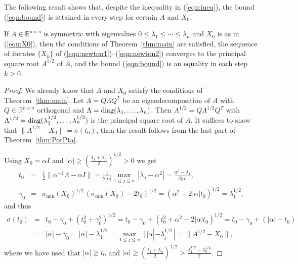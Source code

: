 \documentclass{siamltex}
\begin{document}
The following result shows that, despite the inequality in (\ref{eqn:ineq}),
the bound (\ref{eqn:bound}) is attained in every step for certain $A$ and $X_0$.

\medskip
\begin{corollary}\label{cor:exactSQ}
If $A\in {\mathbb R}^{n\times n}$ is symmetric with  eigenvalues
$0\leq \lambda_1\leq\cdots\leq\lambda_n$ and $X_0$ is as in (\ref{eqn:X0}),
then the conditions of Theorem~\ref{thm:main} are satisfied, the sequence
of iterates $\{X_k\}$ of (\ref{eqn:newton1})--(\ref{eqn:newton2}) converges 
to the principal square root $A^{1/2}$ of $A$, and the bound (\ref{eqn:bound}) 
is an equality in each step $k\geq 0$.
\end{corollary}

\medskip
\begin{proof}
We already know that $A$ and $X_0$ satisfy the conditions of Theorem~\ref{thm:main}.
Let $A=Q\Lambda Q^T$ be an eigendecomposition of $A$ with $Q\in {\mathbb R}^{n\times n}$
orthogonal and $\Lambda={\rm diag}(\lambda_1,\dots,\lambda_n)$. Then
$A^{1/2}=Q\Lambda^{1/2} Q^T$ with
$\Lambda^{1/2}={\rm diag}(\lambda_1^{1/2},\dots,\lambda_n^{1/2})$ is the principal square
root of $A$. It suffices to show that $\|A^{1/2}-X_0\|=\sigma(t_0)$, then the result
follows from the last part of Theorem~\ref{thm:PotPta}.

Using $X_0=\alpha I$ and $|\alpha|\geq \left(\frac{\lambda_1+\lambda_n}{2}\right)^{1/2}>0$ we get
\begin{eqnarray*}
t_0 &=& \frac12\|\alpha^{-1}\Lambda -\alpha I\|=\frac{1}{2|\alpha|}\max_{1\leq j\leq n}\,|\lambda_j-\alpha^2|
=\frac{\alpha^2-\lambda_1}{2|\alpha|},\\
\gamma_0 &=& \sigma_{\min}(X_0)^{1/2}\,(\sigma_{\min}(X_0)-2t_0)^{1/2} =
(\alpha^2-2|\alpha| t_0)^{1/2} = \lambda_1^{1/2},
\end{eqnarray*}
and thus
\begin{eqnarray*}
\sigma(t_0) &=& t_0-\gamma_0+(t_0^2+\gamma_0^2)^{1/2} = t_0-\gamma_0+(t_0^2+\alpha^2-2|\alpha| t_0)^{1/2}
= t_0-\gamma_0+(|\alpha|-t_0)\\
&=&|\alpha|-\gamma_0 = |\alpha|-\lambda_1^{1/2} = \max_{1\leq j\leq n}\,|\,|\alpha|-\lambda_j^{1/2}\,| =
\|A^{1/2}-X_0\|,
\end{eqnarray*}
where we have used that $|\alpha|\geq t_0$ and
$|\alpha|\geq \left(\frac{\lambda_1+\lambda_n}{2}\right)^{1/2}>\frac{\lambda_1^{1/2}+\lambda_n^{1/2}}{2}$.
\end{proof}
\end{document}
